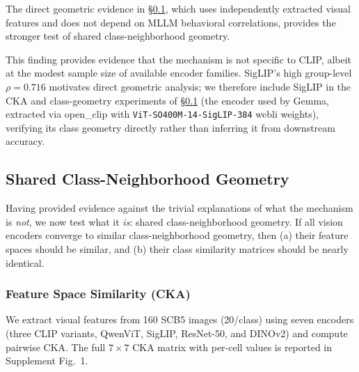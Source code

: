 \documentclass[a4paper,fleqn]{cas-sc}
\begin{document}
 The direct geometric evidence in \S\ref{sec:geometry}, which uses independently extracted visual features and does not depend on MLLM behavioral correlations, provides the stronger test of shared class-neighborhood geometry.

This finding provides evidence that the mechanism is not specific to CLIP, albeit at the modest sample size of available encoder families. SigLIP's high group-level $\rho=0.716$ motivates direct geometric analysis; we therefore include SigLIP in the CKA and class-geometry experiments of \S\ref{sec:geometry} (the encoder used by Gemma, extracted via open\_clip with \texttt{ViT-SO400M-14-SigLIP-384} webli weights), verifying its class geometry directly rather than inferring it from downstream accuracy.

\subsection{Shared Class-Neighborhood Geometry}
\label{sec:geometry}

Having provided evidence against the trivial explanations of what the mechanism is \emph{not}, we now test what it \emph{is}: shared class-neighborhood geometry. If all vision encoders converge to similar class-neighborhood geometry, then (a) their feature spaces should be similar, and (b) their class similarity matrices should be nearly identical.

\subsubsection{Feature Space Similarity (CKA)}

We extract visual features from 160 SCB5 images (20/class) using seven encoders (three CLIP variants, QwenViT, SigLIP, ResNet-50, and DINOv2) and compute pairwise CKA. The full $7\times7$ CKA matrix with per-cell values is reported in Supplement Fig.~1.
\end{document}

